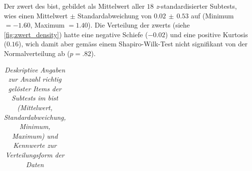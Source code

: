 \documentclass[11pt, twoside, a4paper]{book}		%
\begin{document}
Der \gls{zwert} des \gls{bist}, gebildet als Mittelwert aller $18$ \textit{z}-stand\-ard\-isier\-ter Subtests, wies einen Mittelwert $\pm$ Standardabweichung von $0.02\,\pm\,0.53$ auf (Minimum $= -1.60$, Maximum $= 1.40$). Die Verteilung der \gls{zwert}s (siehe \autoref{fig:zwert_density}) hatte eine negative Schiefe ($-0.02$) und eine positive Kurtosis ($0.16$), wich damit aber gemäss einem Shapiro-Wilk-Test  nicht signifikant von der Normalverteilung ab ($p=.82$).

\begin{table}[!t]
	\centering
	\captionsetup{labelsep = none}
	\caption[Deskriptive Angaben zur ]{\newline  \textit{Deskriptive Angaben zur Anzahl richtig gelöster Items der Subtests im \gls{bist} (Mittelwert, Standardabweichung, Minimum, Maximum) und Kennwerte zur Verteilungsform der Daten} \vspace{.2cm}}
	\label{tab:BIS_descriptives}
	\begin{adjustbox}{width=.82\textwidth,keepaspectratio} %
	\begin{threeparttable}
		\begin{tabular}{
				l
				S[table-format = 2.2]
				S[table-format = 2.2]
				S[table-format = 1.0]
				S[table-format = 2.0]
				S[table-format = 1.2]
				S[table-format = 1.2]
				S[table-format = < 0.3, add-integer-zero=false]
				}
			\hline


\end{tabular}
\end{threeparttable}
\end{adjustbox}
\end{table}
\end{document}
